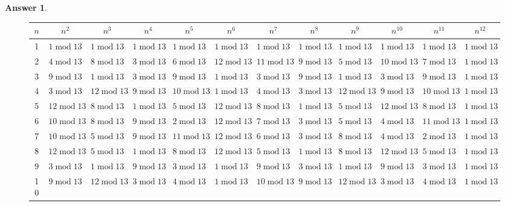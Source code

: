 \documentclass[article, 12pt]{article}
\theoremstyle{definition}
\newtheorem{answer}{Answer}
\newcommand{\Mod}[1]{\;\mathrm{mod}\; #1} %
\begin{document}
\begin{answer}
\begin{figure}[H]
{            \begin{tabular}{|c|c|c|c|c|c|c|c|c|c|c|c|}
                \hline
                $n$ & $n^2$ & $n^3$ & $n^4$ & $n^5$ & $n^6$ & $n^7$ & $n^8$ & $n^9$ & $n^{10}$ & $n^{11}$ & $n^{12}$ \\
                \hline
                1 & $1 \Mod {13}$ & $1 \Mod {13}$ & $1 \Mod {13}$ & $1 \Mod {13}$ & $1 \Mod {13}$ & $1 \Mod {13}$ & $1 \Mod {13}$ & $1 \Mod {13}$ & $1 \Mod {13}$ & $1 \Mod {13}$ & $1 \Mod {13}$ \\
                2 & $4 \Mod {13}$ & $8 \Mod {13}$ & $3 \Mod {13}$ & $6 \Mod {13}$ & $12 \Mod {13}$ & $11 \Mod {13}$ & $9 \Mod {13}$ & $5 \Mod {13}$ & $10 \Mod {13}$ & $7 \Mod {13}$ & $1 \Mod {13}$ \\
                3 & $9 \Mod {13}$ & $1 \Mod {13}$ & $3 \Mod {13}$ & $9 \Mod {13}$ & $1 \Mod {13}$ & $3 \Mod {13}$ & $9 \Mod {13}$ & $1 \Mod {13}$ & $3 \Mod {13}$ & $9 \Mod {13}$ & $1 \Mod {13}$ \\
                4 & $3 \Mod {13}$ & $12 \Mod {13}$ & $9 \Mod {13}$ & $10 \Mod {13}$ & $1 \Mod {13}$ & $4 \Mod {13}$ & $3 \Mod {13}$ & $12 \Mod {13}$ & $9 \Mod {13}$ & $10 \Mod {13}$ & $1 \Mod {13}$ \\
                5 & $12 \Mod {13}$ & $8 \Mod {13}$ & $1 \Mod {13}$ & $5 \Mod {13}$ & $12 \Mod {13}$ & $8 \Mod {13}$ & $1 \Mod {13}$ & $5 \Mod {13}$ & $12 \Mod {13}$ & $8 \Mod {13}$ & $1 \Mod {13}$ \\
                6 & $10 \Mod {13}$ & $8 \Mod {13}$ & $9 \Mod {13}$ & $2 \Mod {13}$ & $12 \Mod {13}$ & $7 \Mod {13}$ & $3 \Mod {13}$ & $5 \Mod {13}$ & $4 \Mod {13}$ & $11 \Mod {13}$ & $1 \Mod {13}$ \\
                7 & $10 \Mod {13}$ & $5 \Mod {13}$ & $9 \Mod {13}$ & $11 \Mod {13}$ & $12 \Mod {13}$ & $6 \Mod {13}$ & $3 \Mod {13}$ & $8 \Mod {13}$ & $4 \Mod {13}$ & $2 \Mod {13}$ & $1 \Mod {13}$ \\
                8 & $12 \Mod {13}$ & $5 \Mod {13}$ & $1 \Mod {13}$ & $8 \Mod {13}$ & $12 \Mod {13}$ & $5 \Mod {13}$ & $1 \Mod {13}$ & $8 \Mod {13}$ & $12 \Mod {13}$ & $5 \Mod {13}$ & $1 \Mod {13}$ \\
                9 & $3 \Mod {13}$ & $1 \Mod {13}$ & $9 \Mod {13}$ & $3 \Mod {13}$ & $1 \Mod {13}$ & $9 \Mod {13}$ & $3 \Mod {13}$ & $1 \Mod {13}$ & $9 \Mod {13}$ & $3 \Mod {13}$ & $1 \Mod {13}$ \\
                10 & $9 \Mod {13}$ & $12 \Mod {13}$ & $3 \Mod {13}$ & $4 \Mod {13}$ & $1 \Mod {13}$ & $10 \Mod {13}$ & $9 \Mod {13}$ & $12 \Mod {13}$ & $3 \Mod {13}$ & $4 \Mod {13}$ & $1 \Mod {13}$ \\

\end{tabular}}
\end{figure}
\end{answer}
\end{document}
